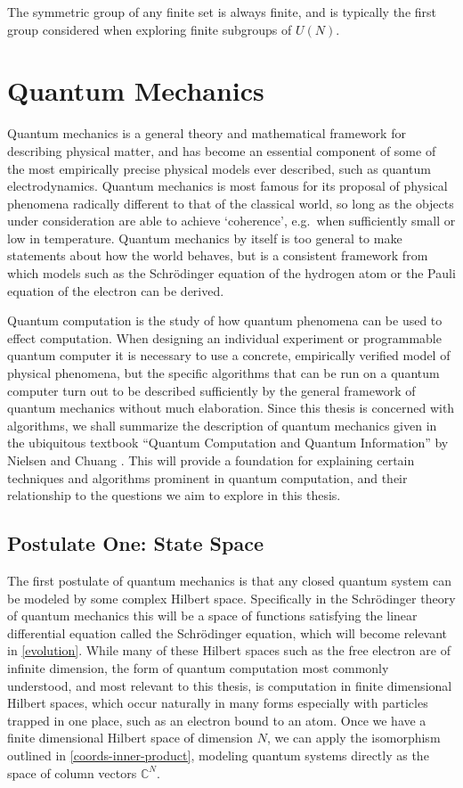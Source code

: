 The symmetric group of any finite set is always finite, and is typically the first group considered when exploring finite subgroups of $U(N)$.

\section{Quantum Mechanics}\label{qm}

Quantum mechanics is a general theory and mathematical framework for describing physical matter, and has become an essential component of some of the most empirically precise physical models ever described, such as quantum electrodynamics. Quantum mechanics is most famous for its proposal of physical phenomena radically different to that of the classical world, so long as the objects under consideration are able to achieve `coherence', e.g.\ when sufficiently small or low in temperature. Quantum mechanics by itself is too general to make statements about how the world behaves, but is a consistent framework from which models such as the Schrödinger equation of the hydrogen atom or the Pauli equation of the electron can be derived.

Quantum computation is the study of how quantum phenomena can be used to effect computation. When designing an individual experiment or programmable quantum computer it is necessary to use a concrete, empirically verified model of physical phenomena, but the specific algorithms that can be run on a quantum computer turn out to be described sufficiently by the general framework of quantum mechanics without much elaboration. Since this thesis is concerned with algorithms, we shall summarize the description of quantum mechanics given in the ubiquitous textbook ``Quantum Computation and Quantum Information'' by Nielsen and Chuang \cite{textbook}. This will provide a foundation for explaining certain techniques and algorithms prominent in quantum computation, and their relationship to the questions we aim to explore in this thesis.
\subsection{Postulate One: State Space}
The first postulate of quantum mechanics is that any closed quantum system can be modeled by some complex Hilbert space. Specifically in the Schrödinger theory of quantum mechanics this will be a space of functions satisfying the linear differential equation called the Schrödinger equation, which will become relevant in \autoref{evolution}. While many of these Hilbert spaces such as the free electron are of infinite dimension, the form of quantum computation most commonly understood, and most relevant to this thesis, is computation in finite dimensional Hilbert spaces, which occur naturally in many forms especially with particles trapped in one place, such as an electron bound to an atom. Once we have a finite dimensional Hilbert space of dimension $N$, we can apply the isomorphism outlined in \autoref{coords-inner-product}, modeling quantum systems directly as the space of column vectors $\mathbb{C}^N$.

